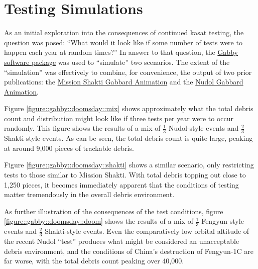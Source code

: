 \section{Testing Simulations}
\label{appendix::gabby}

As an initial exploration into the consequences of continued
\ac{kasat} testing, the question was posed: ``What would it look like
if some number of tests were to happen each year at random times?''
In answer to that question, the
\href{https://github.com/harrison-caudill/gabby}{Gabby software
  package} was used to ``simulate'' two scenarios.  The extent of the
``simulation'' was effectively to combine, for convenience, the output
of two prior publications: the
\href{https://www.youtube.com/watch?v=InBMUkH1i9Q}{Mission Shakti
  Gabbard Animation} and the
\href{https://www.youtube.com/watch?v=U8Y8MNK-L3I}{Nudol Gabbard
  Animation}.

Figure \ref{figure::gabby::doomsday::mix} shows approximately what the
total debris count and distribution might look like if three tests per
year were to occur randomly.  This figure shows the results of a mix
of $\frac{1}{3}$ Nudol-style events and $\frac{2}{3}$ Shakti-style
events.  As can be seen, the total debris count is quite large,
peaking at around 9,000 pieces of trackable debris.

Figure \ref{figure::gabby::doomsday::shakti} shows a similar scenario,
only restricting tests to those similar to Mission Shakti.  With total
debris topping out close to 1,250 pieces, it becomes immediately
apparent that the conditions of testing matter tremendously in the
overall debris environment.

As further illustration of the consequences of the test conditions,
figure \ref{figure::gabby::doomsday::doom} shows the results of a mix
of $\frac{1}{3}$ Fengyun-style events and $\frac{2}{3}$ Shakti-style
events.  Even the comparatively low orbital altitude of the recent
Nudol ``test'' produces what might be considered an unacceptable
debris environment, and the conditions of China's destruction of
Fengyun-1C are far worse, with the total debris count peaking over
40,000.

